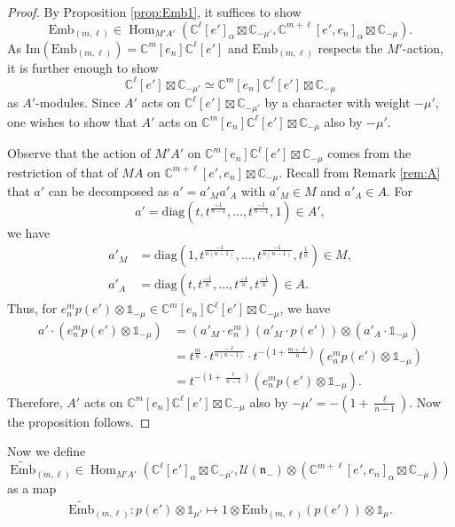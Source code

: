 \documentclass[reqno,11pt]{amsart}
\theoremstyle{remark}
\theoremstyle{definition}
\numberwithin{equation}{section}
\newcommand{\ga}{\alpha}
\newcommand{\fn}{{\mathfrak n}}
\newcommand{\C}{\mathbb{C}}
\newcommand{\Cal}{\mathcal}
\newcommand{\Hom}{\operatorname{Hom}}
\renewcommand{\Im}{\mathrm{Im}}
\newcommand{\diag}{\mathrm{diag}}
\newcommand{\Emb}{\mathrm{Emb}}
\newcommand{\wEmb}{\widetilde{\mathrm{Emb}}}
\begin{document}
\begin{proof}
By Proposition \ref{prop:Emb1}, it suffices to show
\begin{equation*}
\Emb_{(m,\ell)}\in
\Hom_{M'A'}(\C^\ell[e']_\ga \boxtimes \C_{-\mu'},
\C^{m+\ell}[e',e_n]_\ga\boxtimes \C_{-\mu}).
\end{equation*}
As $\Im(\Emb_{(m,\ell)}) = \C^m[e_n]\C^{\ell}[e']$
and $\Emb_{(m,\ell)}$ respects the $M'$-action, 
it is further enough to show 
\begin{equation*}
\C^\ell[e']\boxtimes \C_{-\mu'} 
\simeq
\C^m[e_n]\C^\ell[e']\boxtimes \C_{-\mu}
\end{equation*}
as $A'$-modules.
Since $A'$ acts on $\C^\ell[e']\boxtimes \C_{-\mu'}$ by a character 
with weight $-\mu'$, one wishes to show that $A'$ acts on 
$\C^m[e_n]\C^\ell[e']\boxtimes \C_{-\mu}$ also by $-\mu'$.

Observe that
the action of $M'A'$ on $\C^m[e_n]\C^\ell[e']\boxtimes \C_{-\mu}$
comes from the restriction of that of $MA$ on $\C^{m+\ell}[e',e_n]\boxtimes \C_{-\mu}$.
Recall from Remark \ref{rem:A} that $a'$ can be decomposed as
$a' = a'_M a'_A$ with $a'_M \in M$ and $a'_A \in A$. For 
\begin{equation*}
a' = \diag(t, t^{\frac{-1}{n-1}}, \ldots, t^{\frac{-1}{n-1}}, 1) \in A',
\end{equation*}
we have
\begin{align*}
a'_M 
&= \diag(1,t^{\frac{-1}{n(n-1)}},\ldots, t^{\frac{-1}{n(n-1)}}, t^{\frac{1}{n}})
\in M,\\
a'_A
&= \diag(t,t^{\frac{-1}{n}},\ldots, t^{\frac{-1}{n}}, t^{\frac{-1}{n}}) 
\in A.
\end{align*}
Thus, for $e_n^mp(e')\otimes \mathbb{1}_{-\mu}
\in \C^m[e_n]\C^\ell[e']\boxtimes \C_{-\mu}$, we have 
\begin{align*}
a'\cdot (e_n^mp(e')\otimes \mathbb{1}_{-\mu})
&=(a'_M \cdot e_n^m)(a'_M \cdot p(e'))\otimes (a'_A \cdot \mathbb{1}_{-\mu})\\
&=t^{\tfrac{m}{n}}\cdot 
t^{\tfrac{-\ell}{n(n-1)}} \cdot t^{-(1+\tfrac{m+\ell}{n})}(e_n^mp(e')\otimes \mathbb{1}_{-\mu})\\
&=t^{-(1+\tfrac{\ell}{n-1})}(e_n^mp(e')\otimes \mathbb{1}_{-\mu}).
\end{align*}
Therefore, $A'$ acts on $\C^m[e_n]\C^\ell[e']\boxtimes \C_{-\mu}$ also 
by $-\mu' = -(1+\tfrac{\ell}{n-1})$. 
Now the proposition follows.
\end{proof}

Now we define
\begin{equation*}
\wEmb_{(m,\ell)} \in 
\Hom_{M'A'}(\C^\ell[e']_\ga\boxtimes \C_{-\mu'},
\Cal{U}(\fn_-) \otimes (\C^{m+\ell}[e',e_n]_\ga\boxtimes \C_{-\mu}))
\end{equation*}
as a map
\begin{align*}
\wEmb_{(m,\ell)}\colon p(e')\otimes \mathbb{1}_{\mu'}
\longmapsto
1\otimes \Emb_{(m,\ell)}(p(e')) \otimes \mathbb{1}_{\mu}.
\end{align*}
\end{document}
